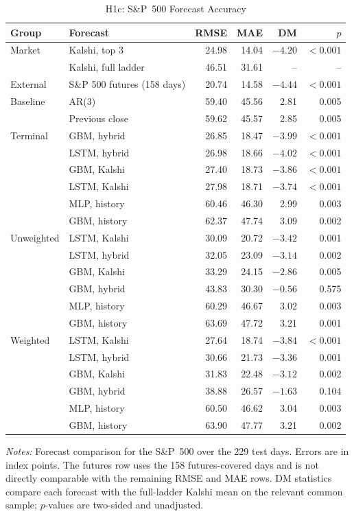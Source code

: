 \documentclass[12pt,a4paper]{report}
\newcommand{\tablenote}[1]{%
  \par\vspace{0.4em}%
  \begin{minipage}{0.9\textwidth}%
  \footnotesize\raggedright\emph{Notes:} #1%
  \end{minipage}%
}
\begin{document}
\begin{table}[H]
\centering
\caption{H1c: S\&P~500 Forecast Accuracy}
\label{tab:h1c-sp500}
\footnotesize
\begin{tabular}{@{}llrrrr@{}}
\toprule
Group & Forecast & RMSE & MAE & DM & $p$ \\
\midrule
Market & Kalshi, top 3 & 24.98 & 14.04 & $-4.20$ & $<0.001$ \\
 & Kalshi, full ladder & 46.51 & 31.61 & -- & -- \\
\midrule
External & S\&P 500 futures (158 days) & 20.74 & 14.58 & $-4.44$ & $<0.001$ \\
\midrule
Baseline & AR(3) & 59.40 & 45.56 & 2.81 & 0.005 \\
 & Previous close & 59.62 & 45.57 & 2.85 & 0.005 \\
\midrule
Terminal & GBM, hybrid & 26.85 & 18.47 & $-3.99$ & $<0.001$ \\
 & LSTM, hybrid & 26.98 & 18.66 & $-4.02$ & $<0.001$ \\
 & GBM, Kalshi & 27.40 & 18.73 & $-3.86$ & $<0.001$ \\
 & LSTM, Kalshi & 27.98 & 18.71 & $-3.74$ & $<0.001$ \\
 & MLP, history & 60.46 & 46.30 & 2.99 & 0.003 \\
 & GBM, history & 62.37 & 47.74 & 3.09 & 0.002 \\
\midrule
Unweighted & LSTM, Kalshi & 30.09 & 20.72 & $-3.42$ & 0.001 \\
 & LSTM, hybrid & 32.05 & 23.09 & $-3.14$ & 0.002 \\
 & GBM, Kalshi & 33.29 & 24.15 & $-2.86$ & 0.005 \\
 & GBM, hybrid & 43.83 & 30.30 & $-0.56$ & 0.575 \\
 & MLP, history & 60.29 & 46.67 & 3.02 & 0.003 \\
 & GBM, history & 63.69 & 47.72 & 3.21 & 0.001 \\
\midrule
Weighted & LSTM, Kalshi & 27.64 & 18.74 & $-3.84$ & $<0.001$ \\
 & LSTM, hybrid & 30.66 & 21.73 & $-3.36$ & 0.001 \\
 & GBM, Kalshi & 31.83 & 22.48 & $-3.12$ & 0.002 \\
 & GBM, hybrid & 38.88 & 26.57 & $-1.63$ & 0.104 \\
 & MLP, history & 60.50 & 46.62 & 3.04 & 0.003 \\
 & GBM, history & 63.90 & 47.77 & 3.21 & 0.002 \\
\bottomrule
\end{tabular}
\tablenote{Forecast comparison for the S\&P~500 over the 229 test days.
Errors are in index points. The futures row uses the 158 futures-covered days
and is not directly comparable with the remaining RMSE and MAE rows. DM
statistics compare each forecast with the full-ladder Kalshi mean on the
relevant common sample; $p$-values are two-sided and unadjusted.}
\end{table}
\end{document}
